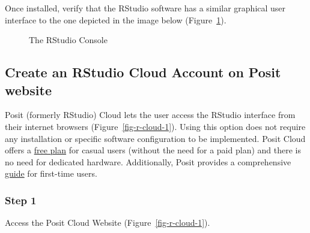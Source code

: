 \documentclass[
  letterpaper,
  DIV=11,
  numbers=noendperiod]{scrreprt}
\begin{document}
Once installed, verify that the RStudio software has a similar graphical
user interface to the one depicted in the image below
(Figure~\ref{fig-rstudio-console-1}).

\begin{figure}


\caption{\label{fig-rstudio-console-1}The RStudio Console}

\end{figure}%

\subsection{Create an RStudio Cloud Account on Posit
website}\label{create-an-rstudio-cloud-account-on-posit-website}

Posit (formerly RStudio) Cloud lets the user access the RStudio
interface from their internet browsers (Figure~\ref{fig-r-cloud-1}).
Using this option does not require any installation or specific software
configuration to be implemented. Posit Cloud offers a
\href{https://posit.cloud/plans/free}{free plan} for casual users
(without the need for a paid plan) and there is no need for dedicated
hardware. Additionally, Posit provides a comprehensive
\href{https://posit.cloud/learn/guide}{guide} for first-time users.

\subsubsection{Step 1}\label{step-1-1}

Access the Posit Cloud Website (Figure~\ref{fig-r-cloud-1}).
\end{document}
